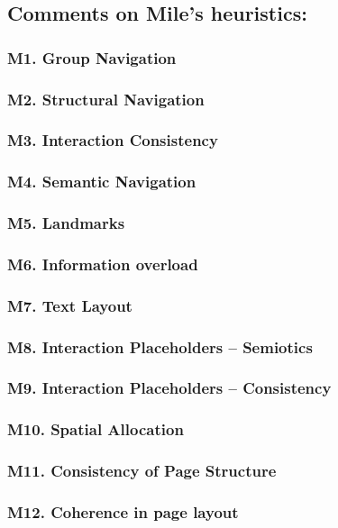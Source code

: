 \subsection{Comments on Mile’s heuristics:}
\subsubsection*{M1. Group Navigation}
\subsubsection*{M2. Structural Navigation}
\subsubsection*{M3. Interaction Consistency}
\subsubsection*{M4. Semantic Navigation}
\subsubsection*{M5. Landmarks}
\subsubsection*{M6. Information overload}
\subsubsection*{M7. Text Layout}
\subsubsection*{M8. Interaction Placeholders – Semiotics}
\subsubsection*{M9. Interaction Placeholders – Consistency}
\subsubsection*{M10. Spatial Allocation}
\subsubsection*{M11. Consistency of Page Structure}
\subsubsection*{M12. Coherence in page layout}
 	 
 	 



